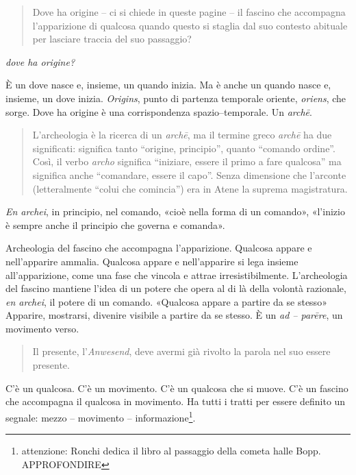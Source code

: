\documentclass{../../lib/gs}
\begin{document}
\begin{quote}
\begin{sf}
\small
Dove ha origine – ci si chiede in queste pagine – il fascino che accompagna l'apparizione di qualcosa quando questo si staglia dal suo contesto abituale per lasciare traccia del suo passaggio?
\end{sf}
\end{quote}

\emph{dove ha origine?}

È un dove nasce e, insieme, un quando inizia. Ma è anche un quando nasce e, insieme, un dove inizia. \emph{Origins}, punto di partenza temporale oriente, \emph{oriens}, che sorge. Dove ha origine è una corrispondenza spazio–temporale. Un \emph{archē}.


\begin{quote}
\begin{sf}
\small
L'archeologia è la ricerca di un \emph{archē}, ma il termine greco \emph{archē} ha due significati: significa tanto “origine, principio”, quanto “comando ordine”. Così, il verbo \emph{archo} significa “iniziare, essere il primo a fare qualcosa” ma significa anche “comandare, essere il capo”. Senza dimensione che l'arconte (letteralmente “colui che comincia”) era in Atene la suprema magistratura. \cite{agamben2017}
\end{sf}
\end{quote}

\emph{En archei}, in principio, nel comando, «cioè nella forma di un comando», «l'inizio è sempre anche il principio che governa e comanda».

Archeologia del fascino che accompagna l'apparizione. Qualcosa appare e nell'apparire ammalia. Qualcosa appare e nell'apparire si lega insieme all'apparizione, come una fase che vincola e attrae irresistibilmente. L'archeologia del fascino mantiene l'idea di un potere che opera al di là della volontà razionale, \emph{en archei}, il potere di un comando. «Qualcosa appare a partire da se stesso» \cite{agamben2019} Apparire, mostrarsi, divenire visibile a partire da se stesso. È un \emph{ad – parēre}, un movimento verso.

\begin{quote}
\begin{sf}
\small
Il presente, l'\emph{Anwesend}, deve avermi già rivolto la parola nel suo essere presente. \cite{agamben2019}
\end{sf}
\end{quote}

C'è un qualcosa. C'è un movimento. C'è un qualcosa che si muove. C'è un fascino che accompagna il qualcosa in movimento. Ha tutti i tratti per essere definito un segnale: mezzo – movimento – informazione\footnote{attenzione: Ronchi dedica il libro al passaggio della cometa halle Bopp. APPROFONDIRE}.
\end{document}
